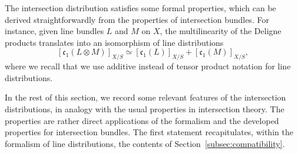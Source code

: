 \documentclass[11pt]{article}
\theoremstyle{plain}
\theoremstyle{definition}
\newcommand{\cfrak}{\mathfrak c}
\begin{document}
The intersection distribution satisfies some formal properties, which can be derived straightforwardly from the properties of intersection bundles. For instance, given line bundles $L$ and $M$ on $X$, the multilinearity of the Deligne products translates into an isomorphism of line distributions
\begin{equation}\label{eq:c1-tensor-product-distribution}
[\cfrak_{1}(L\otimes M)]_{X/S}\simeq [\cfrak_{1}(L)]_{X/S}+[\cfrak_{1}(M)]_{X/S},
\end{equation}
where we recall that we use additive instead of tensor product notation for line distributions.

In the rest of this section, we record some relevant features of the intersection distributions, in analogy with the usual properties in intersection theory. The properties are rather direct applications of the formalism and the developed properties for intersection bundles. The first statement recapitulates, within the formalism of line distributions, the contents of Section~\ref{subsec:compatibility}.
\end{document}

